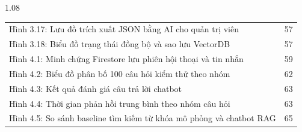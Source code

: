 \begin{spacing}{1.08}
\begin{longtable}{@{}p{}r@{}}
Hình 3.17: Lưu đồ trích xuất JSON bằng AI cho quản trị viên & 57\\
Hình 3.18: Biểu đồ trạng thái đồng bộ và sao lưu VectorDB & 57\\
Hình 4.1: Minh chứng Firestore lưu phiên hội thoại và tin nhắn & 59\\
Hình 4.2: Biểu đồ phân bố 100 câu hỏi kiểm thử theo nhóm & 62\\
Hình 4.3: Kết quả đánh giá câu trả lời chatbot & 63\\
Hình 4.4: Thời gian phản hồi trung bình theo nhóm câu hỏi & 63\\
Hình 4.5: So sánh baseline tìm kiếm từ khóa mô phỏng và chatbot RAG & 65\\
\end{longtable}
\end{spacing}
